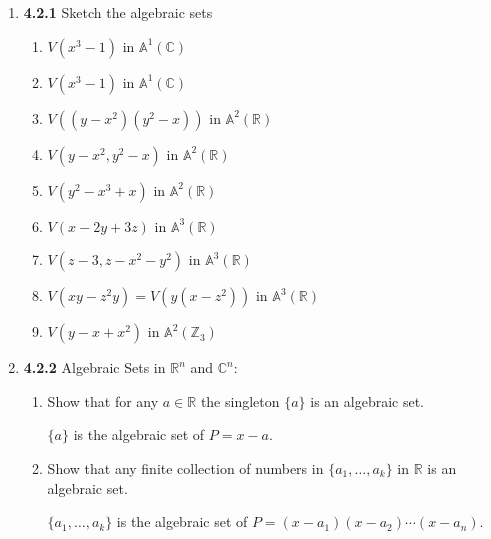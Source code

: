 \documentclass[12pt]{article}
\newcommand{\R}{\mathbb{R}}
\newcommand{\C}{\mathbb{C}}
\newcommand{\A}{\mathbb{A}}
\newcommand{\Z}{\mathbb{Z}}
\begin{document}
\begin{enumerate}
    
    \item \textbf{4.2.1} Sketch the algebraic sets
    \begin{enumerate}
    
    \item $V(x^3-1)$ in $\A^1(\C)$
    \vspace{2in}
    
    \item $V(x^3-1)$ in $\A^1(\C)$
    \vspace{2in}
    
    \item $V((y-x^2)(y^2-x))$ in $\A^2(\R)$
    \vspace{2in}
    
    \item $V(y-x^2, y^2-x)$ in $\A^2(\R)$
    \vspace{2in}
    
    \item $V(y^2-x^3+x)$ in $\A^2(\R)$
    \vspace{2in}
    
    \item $V(x-2y+3z)$ in $\A^3(\R)$
    \vspace{2in}
    
    \item $V(z-3, z-x^2-y^2)$ in $\A^3(\R)$
    \vspace{2in}
    
    \item $V(xy-z^2y)=V(y(x-z^2))$ in $\A^3(\R)$
    \vspace{2in}
   
    \item $V(y-x+x^2)$ in $\A^2(\Z_3)$
    \vspace{2in}
    \end{enumerate}
    
    \item \textbf{4.2.2} Algebraic Sets in $\R^n$ and $\C^n$:
    \begin{enumerate}
    
    \item Show that for any $a\in \R$ the singleton $\{a\}$ is an algebraic set.
    
	$\{a\}$ is the algebraic set of $P=x-a$.    
    
    \item Show that any finite collection of numbers in $\{a_1, \dots, a_k\}$ in $\R$ is an algebraic set.
    
	$\{a_1, \dots, a_k\}$ is the algebraic set of $P=(x-a_1)(x-a_2)\cdots(x-a_n)$.    
    

\end{enumerate}
\end{enumerate}
\end{document}
